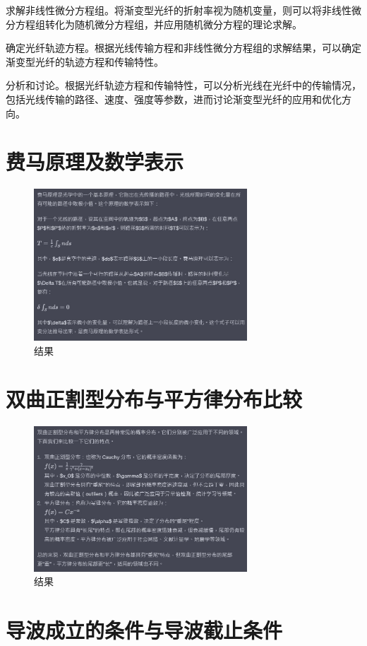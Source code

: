 \documentclass[12pt, a4paper, oneside]{article}
\begin{document}
\begin{spacing}{2.0}
求解非线性微分方程组。将渐变型光纤的折射率视为随机变量，则可以将非线性微分方程组转化为随机微分方程组，并应用随机微分方程的理论求解。

确定光纤轨迹方程。根据光线传输方程和非线性微分方程组的求解结果，可以确定渐变型光纤的轨迹方程和传输特性。

分析和讨论。根据光纤轨迹方程和传输特性，可以分析光线在光纤中的传输情况，包括光线传输的路径、速度、强度等参数，进而讨论渐变型光纤的应用和优化方向。

\section{费马原理及数学表示}
\begin{figure}[htbp][H]
    \centering
    \includegraphics[width=8cm]{B.jpg}
    \caption{结果}
\end{figure}

\section{双曲正割型分布与平方律分布比较}
\begin{figure}[htbp][H]
    \centering
    \includegraphics[width=8cm]{C.jpg}
    \caption{结果}
\end{figure}

\section{导波成立的条件与导波截止条件 }


\end{spacing}
\end{document}
